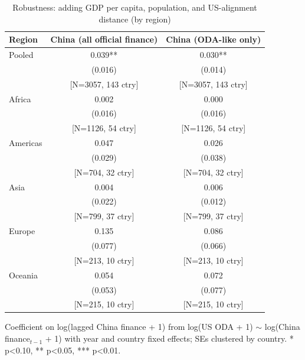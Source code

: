 \begin{table}[htbp]
\centering
\caption{Robustness: adding GDP per capita, population, and US-alignment distance (by region)}
\label{tab:controls}
\begin{tabular}{lcc}
\toprule
Region & China (all official finance) & China (ODA-like only) \\
\midrule
Pooled & 0.039** & 0.030** \\
 & (0.016) & (0.014) \\
 & [N=3057, 143 ctry] & [N=3057, 143 ctry] \\[2pt]
Africa & 0.002 & 0.000 \\
 & (0.016) & (0.016) \\
 & [N=1126, 54 ctry] & [N=1126, 54 ctry] \\[2pt]
Americas & 0.047 & 0.026 \\
 & (0.029) & (0.038) \\
 & [N=704, 32 ctry] & [N=704, 32 ctry] \\[2pt]
Asia & 0.004 & 0.006 \\
 & (0.022) & (0.012) \\
 & [N=799, 37 ctry] & [N=799, 37 ctry] \\[2pt]
Europe & 0.135 & 0.086 \\
 & (0.077) & (0.066) \\
 & [N=213, 10 ctry] & [N=213, 10 ctry] \\[2pt]
Oceania & 0.054 & 0.072 \\
 & (0.053) & (0.077) \\
 & [N=215, 10 ctry] & [N=215, 10 ctry] \\[2pt]
\bottomrule
\end{tabular}
\begin{minipage}{0.9\textwidth}
\vspace{4pt}
\footnotesize Coefficient on log(lagged China finance + 1) from
log(US ODA + 1) $\sim$ log(China finance$_{t-1}$ + 1) with year and
country fixed effects; SEs clustered by country. * p<0.10, ** p<0.05, *** p<0.01.
\end{minipage}
\end{table}
